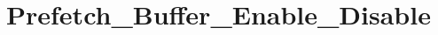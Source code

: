 \hypertarget{group___prefetch___buffer___enable___disable}{\section{Prefetch\-\_\-\-Buffer\-\_\-\-Enable\-\_\-\-Disable}
\label{group___prefetch___buffer___enable___disable}
}
